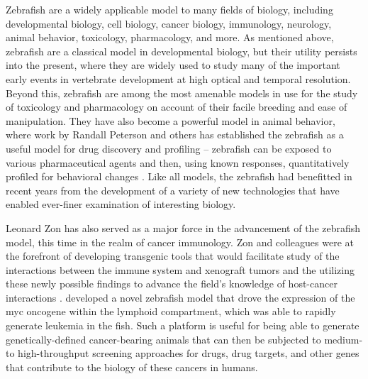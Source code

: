 Zebrafish are a widely applicable model to many fields of biology, including developmental biology, cell biology, cancer biology, immunology, neurology, animal behavior, toxicology, pharmacology, and more. As mentioned above, zebrafish are a classical model in developmental biology, but their utility persists into the present, where they are widely used to study many of the important early events in vertebrate development at high optical and temporal resolution. Beyond this, zebrafish are among the most amenable models in use for the study of toxicology and pharmacology on account of their facile breeding and ease of manipulation. They have also become a powerful model in animal behavior, where work by Randall Peterson and others has established the zebrafish as a useful model for drug discovery and profiling -- zebrafish can be exposed to various pharmaceutical agents and then, using known responses, quantitatively profiled for behavioral changes \citep{MacRae2003, MacRae2015, Peterson2012, Rihel2010, Kokel2010, Kokel2011, Bruni2016, Zon2005, Patton2021}. Like all models, the zebrafish had benefitted in recent years from the development of a variety of new technologies that have enabled ever\hyp{}finer examination of interesting biology.

Leonard Zon has also served as a major force in the advancement of the zebrafish model, this time in the realm of cancer immunology. Zon and colleagues were at the forefront of developing transgenic tools that would facilitate study of the interactions between the immune system and xenograft tumors and the utilizing these newly possible findings to advance the field's knowledge of host\hyp{}cancer interactions \citep{Cagan2019, Amatruda2002, Trede2004, McConnell2021}. \citet{Langenau2003} developed a novel zebrafish model that drove the expression of the myc oncogene within the lymphoid compartment, which was able to rapidly generate leukemia in the fish. Such a platform is useful for being able to generate genetically\hyp{}defined cancer\hyp{}bearing animals that can then be subjected to medium\hyp{} to high\hyp{}throughput screening approaches for drugs, drug targets, and other genes that contribute to the biology of these cancers in humans. 

